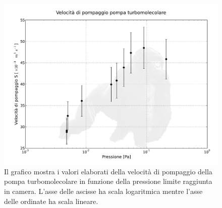 \begin{figure}[b]
	\centering
		\includegraphics[width=14cm]{turbo.pdf}
	\caption{Il grafico mostra i valori elaborati della velocità di pompaggio della pompa turbomolecolare in funzione della pressione limite raggiunta in camera. L'asse delle ascisse ha scala logaritmica mentre l'asse delle ordinate ha scala lineare.}
		\label{fig:turbo}
\end{figure}
